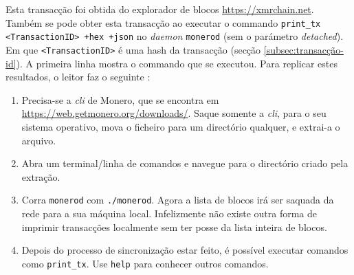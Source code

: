\begin{appendices}
Esta transacção foi obtida do explorador de blocos \url{https://xmrchain.net}. Também se pode obter esta transacção ao executar o commando {\tt print\_tx <TransactionID> +hex +json} no {\em daemon} {\tt monerod} (sem o parámetro {\em detached}). Em que {\tt <TransactionID>} é uma hash da transacção (secção \ref{subsec:transacção-id}). A primeira linha mostra o commando que se executou. 
Para replicar estes resultados, o leitor faz o seguinte :
\begin{enumerate}
    \item Precisa-se a {\em cli} de Monero, que se encontra em \url{https://web.getmonero.org/downloads/}. Saque somente a {\em cli}, para o seu sistema operativo, mova o ficheiro para um directório qualquer, e extrai-a o arquivo. 
    \item Abra um terminal/linha de comandos e navegue para o directório criado pela extração.
    \item Corra {\tt monerod} com {\tt ./monerod}. Agora a lista de blocos irá ser saquada da rede para a sua máquina local. Infelizmente não existe outra forma de imprimir transacções localmente sem ter posse da lista inteira de blocos.    
    \item Depois do processo de sincronização estar feito, é possível executar comandos como {\tt print\_tx}. Use {\tt help} para conhecer outros comandos.
\end{enumerate}


\end{appendices}

